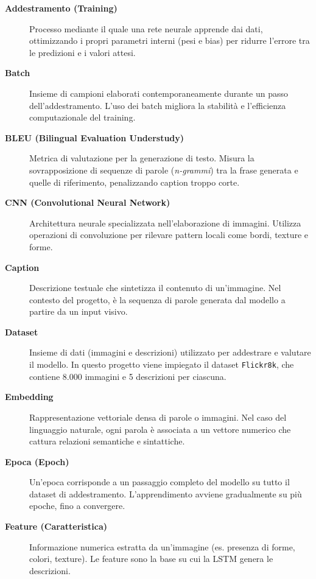 \documentclass[11pt,a4paper]{report}
\newcommand{\dataset}{\texttt{Flickr8k}}
\begin{document}
\begin{description}

  \item[\textbf{Addestramento (Training)}]  
  Processo mediante il quale una rete neurale apprende dai dati, ottimizzando i propri parametri interni (pesi e bias) per ridurre l’errore tra le predizioni e i valori attesi.

  \item[\textbf{Batch}]  
  Insieme di campioni elaborati contemporaneamente durante un passo dell’addestramento.  
  L’uso dei batch migliora la stabilità e l’efficienza computazionale del training.

  \item[\textbf{BLEU (Bilingual Evaluation Understudy)}]  
  Metrica di valutazione per la generazione di testo.  
  Misura la sovrapposizione di sequenze di parole (\emph{n-grammi}) tra la frase generata e quelle di riferimento, penalizzando caption troppo corte.

  \item[\textbf{CNN (Convolutional Neural Network)}]  
  Architettura neurale specializzata nell’elaborazione di immagini.  
  Utilizza operazioni di convoluzione per rilevare pattern locali come bordi, texture e forme.

  \item[\textbf{Caption}]  
  Descrizione testuale che sintetizza il contenuto di un’immagine.  
  Nel contesto del progetto, è la sequenza di parole generata dal modello a partire da un input visivo.

  \item[\textbf{Dataset}]  
  Insieme di dati (immagini e descrizioni) utilizzato per addestrare e valutare il modello.  
  In questo progetto viene impiegato il dataset \dataset{}, che contiene 8.000 immagini e 5 descrizioni per ciascuna.

  \item[\textbf{Embedding}]  
  Rappresentazione vettoriale densa di parole o immagini.  
  Nel caso del linguaggio naturale, ogni parola è associata a un vettore numerico che cattura relazioni semantiche e sintattiche.

  \item[\textbf{Epoca (Epoch)}]  
  Un’epoca corrisponde a un passaggio completo del modello su tutto il dataset di addestramento.  
  L’apprendimento avviene gradualmente su più epoche, fino a convergere.

  \item[\textbf{Feature (Caratteristica)}]  
  Informazione numerica estratta da un’immagine (es. presenza di forme, colori, texture).  
  Le feature sono la base su cui la LSTM genera le descrizioni.


\end{description}
\end{document}
